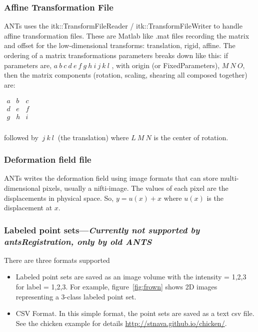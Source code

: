 \documentclass{InsightArticle}
\begin{document}
\subsubsection{Affine Transformation File}
ANTs uses the itk::TransformFileReader / itk::TransformFileWriter to handle affine transformation files. 
These are Matlab like .mat files recording the matrix and offset for
the low-dimensional transforms: translation, rigid, affine.
The ordering of a matrix transformations parameters breaks down like
this: if parameters are,  $ a~b~c~d~e~f~g~h~i~j~k~l $ , with origin
(or FixedParameters), $ M~N~O $, then the matrix components (rotation,
scaling, shearing all composed together) are:

$ \begin{matrix}
a & b & c \\
d & e & f  \\
g & h & i \\ 
\end{matrix} $

followed by  $~j~k~l~$ (the translation) where $L~M~N$  is the center
of rotation.

\subsubsection{Deformation field file}
ANTs writes the deformation field using image formats that can store
multi-dimensional pixels, usually a nifti-image.  The values of each
pixel are the displacements in physical space.   So, $y=u(x)+x$ where
$u(x)$ is the displacement at $x$.

\subsubsection{Labeled point sets---\textit{Currently not supported by
  antsRegistration, only by old ANTS}}
There are three formats supported
\begin{itemize}
\item  Labeled point sets are saved as an image volume with the intensity = 1,2,3 for label = 1,2,3. For example, 
figure~\ref{fig:frown} shows 2D images representing a 3-class labeled point set. 
\item CSV Format. In this simple format, the point sets are saved as a
  text csv file.  See the chicken example for details \href{http://stnava.github.io/chicken/}{http://stnava.github.io/chicken/}.
\end{itemize}
\end{document}

